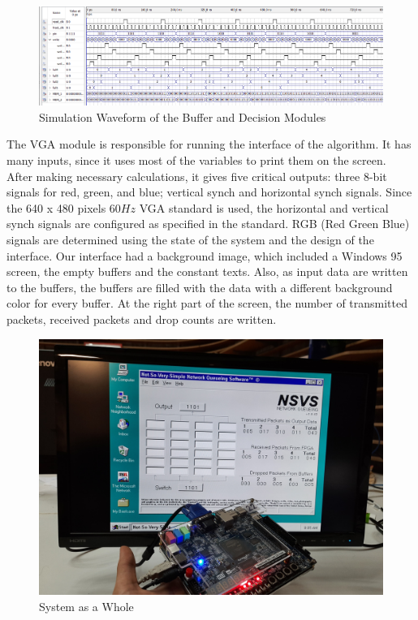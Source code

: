 \documentclass[journal,twoside]{IEEEtran}
\begin{document}
\begin{figure}[ht]
    \centering
    \includegraphics[width=0.95\linewidth]{figures/buffer_decision_sim.PNG}
    \captionsetup{justification=centering}
    \caption{Simulation Waveform of the Buffer and Decision Modules}
    \label{fig:buffer_decision_simulation}
\end{figure}

The VGA module is responsible for running the interface of the algorithm. It has many inputs, since it uses most of the variables to print them on the screen. After making necessary calculations, it gives five critical outputs: three 8-bit signals for red, green, and blue; vertical synch and horizontal synch signals. Since the 640 x 480 pixels $60Hz$ VGA standard is used, the horizontal and vertical synch signals are configured as specified in the standard. RGB (Red Green Blue) signals are determined using the state of the system and the design of the interface. Our interface had a background image, which included a Windows 95 screen, the empty buffers and the constant texts. Also, as input data are written to the buffers, the buffers are filled with the data with a different background color for every buffer. At the right part of the screen, the number of transmitted packets, received packets and drop counts are written.\\

\vspace{1em}

\begin{figure}[b]
    \centering
    \includegraphics[width=0.95\linewidth]{figures/FFFPPPGGGA.jpg}
    \captionsetup{justification=centering}
    \caption{System as a Whole}
    \label{fig:fpga}
\end{figure} 
\end{document}
